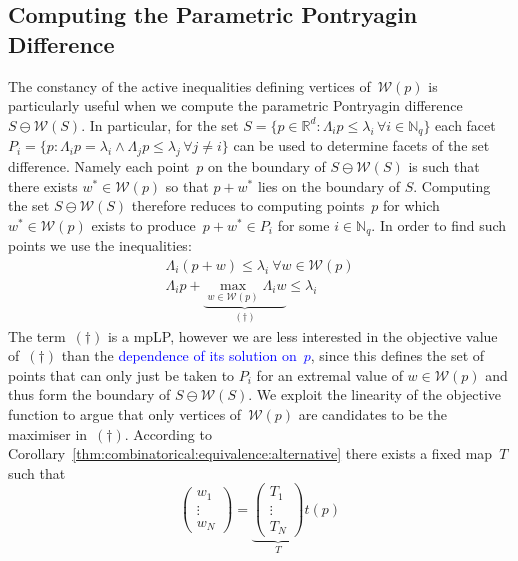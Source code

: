 \documentclass[smallextended]{svjour3}       %
\numberwithin{equation}{section}
\newcommand{\revision}[1]{\textcolor{blue}{#1}}
\begin{document}
\subsection{Computing the Parametric Pontryagin Difference}\label{ssec:computation:p:pontryagin:difference}
%
%
%
The constancy of the active inequalities defining vertices of~$\mathcal W(p)$ is particularly useful when we compute the parametric Pontryagin difference $S\ominus\mathcal W(S)$.
%
In particular, for the set $S=\{p\in\mathbb R^d:\Lambda_i p\leq\lambda_i \, \forall i\in\mathbb N_q\}$ each facet $P_i=\{p:\Lambda_i p=\lambda_i \wedge \Lambda_j p\leq\lambda_j \, \forall j\neq i\}$ can be used to determine facets of the set difference.
%
Namely each point~$p$ on the boundary of $S\ominus\mathcal W(S)$ is such that there exists $w^\ast\in\mathcal W(p)$ so that $p+w^\ast$ lies on the boundary of $S$.
%
Computing the set $S\ominus\mathcal W(S)$ therefore reduces to computing points~$p$ for which $w^\ast\in\mathcal W(p)$ exists to produce~$p+w^\ast\in P_i$ for some $i\in\mathbb N_q$.
%
In order to find such points we use the inequalities:
%
\[%
\begin{split}
  \Lambda_i(p+w)\leq\lambda_i\ \forall w\in\mathcal W(p)\\
  \Lambda_i p+\underbrace{\max_{w\in\mathcal W(p)}\Lambda_i w}_{(\dagger)}\leq\lambda_i
\end{split}
\]%
%
The term~$(\dagger)$ is a mpLP, however we are less interested in the
objective value of~$(\dagger)$ than the \revision{dependence of its solution
on~$p$}, since this defines the set of points 
that can only just be taken to $P_i$ for an extremal value of $w\in\mathcal W(p)$ and thus form the boundary of $S\ominus \mathcal W(S)$.
%
We exploit the linearity of the objective function to argue that only vertices of~$\mathcal W(p)$ are candidates to be the maximiser in~$(\dagger)$.
%
According to Corollary~\ref{thm:combinatorical:equivalence:alternative} there exists a fixed map~$T$ such that 
%
\[%
  \begin{pmatrix}w_1\\ \vdots\\ w_N\end{pmatrix} = \underbrace{\begin{pmatrix}T_1\\ \vdots\\ T_N\end{pmatrix}}_T t(p)
\]%
\end{document}
